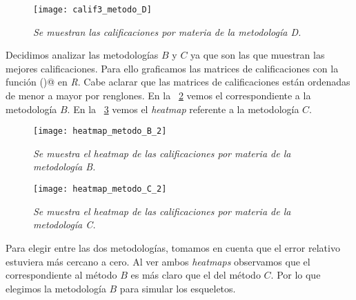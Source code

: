 \begin{figure}[H]
\centering
\texttt{[image: calif3\_metodo\_D]} %
\caption[\textit{Metodología D}]{\textit{Se muestran las calificaciones por materia de la metodología D.}}\label{fig_metodo_D}
\end{figure} 


Decidimos analizar las metodologías $B$ y $C$ ya que son las que muestran las mejores calificaciones. Para ello graficamos las matrices de calificaciones con la función \verb@heatmap()@ en \textit{R}. Cabe aclarar que las matrices de calificaciones están ordenadas de menor a mayor por renglones. En la \figurename{~\ref{fig_heatmap_B}} vemos el correspondiente a la metodología $B$. En la \figurename{~\ref{fig_heatmap_C}} vemos el \textit{heatmap} referente a la metodología $C$.

\begin{figure}[H]
\centering
\texttt{[image: heatmap\_metodo\_B\_2]} %
\caption[\textit{Heatmap metodología B}]{\textit{Se muestra el heatmap de las calificaciones por materia de la metodología B.}}\label{fig_heatmap_B}
\end{figure}

\begin{figure}[H]
\centering
\texttt{[image: heatmap\_metodo\_C\_2]} %
\caption[\textit{Heatmap metodología C}]{\textit{Se muestra el heatmap de las calificaciones por materia de la metodología C.}}\label{fig_heatmap_C}
\end{figure}


Para elegir entre las dos metodologías, tomamos en cuenta que el error relativo estuviera más cercano a cero. Al ver ambos \textit{heatmaps} observamos que el correspondiente al método $B$ es más claro que el del método $C$. Por lo que elegimos la metodología $B$ para simular los esqueletos. %



